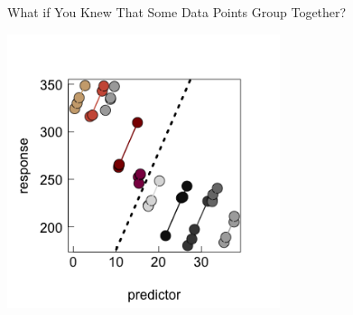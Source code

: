 \documentclass{beamer}
\begin{document}
\begin{frame}{What if You Knew That Some Data Points Group Together?}
  \begin{center}
    \includegraphics[width=0.6\textwidth]{lectures/day_1_intro_to_mems/figures/unnamed-chunk-14-1.png} %
  \end{center}
\end{frame}
\end{document}
